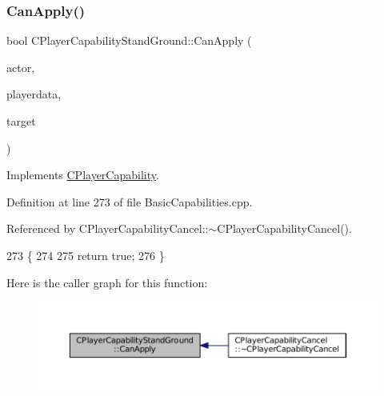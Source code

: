 \subsubsection{\texorpdfstring{Can\+Apply()}{CanApply()}}
{\footnotesize\ttfamily bool C\+Player\+Capability\+Stand\+Ground\+::\+Can\+Apply (\begin{DoxyParamCaption}\item[{std\+::shared\+\_\+ptr$<$ \hyperlink{classCPlayerAsset}{C\+Player\+Asset} $>$}]{actor,  }\item[{std\+::shared\+\_\+ptr$<$ \hyperlink{classCPlayerData}{C\+Player\+Data} $>$}]{playerdata,  }\item[{std\+::shared\+\_\+ptr$<$ \hyperlink{classCPlayerAsset}{C\+Player\+Asset} $>$}]{target }\end{DoxyParamCaption})\hspace{0.3cm}{\ttfamily [virtual]}}



Implements \hyperlink{classCPlayerCapability_ae96263e0950f496492f8baeb877b9554}{C\+Player\+Capability}.



Definition at line 273 of file Basic\+Capabilities.\+cpp.



Referenced by C\+Player\+Capability\+Cancel\+::$\sim$\+C\+Player\+Capability\+Cancel().


\begin{DoxyCode}
273                                                                                                            
                                                        \{
274     
275     \textcolor{keywordflow}{return} \textcolor{keyword}{true};
276 \}
\end{DoxyCode}
Here is the caller graph for this function\+:\nopagebreak
\begin{figure}[H]
\begin{center}
\leavevmode
\includegraphics[width=350pt]{classCPlayerCapabilityStandGround_a468f2618edaebf2088b5917d2688b6f6_icgraph}
\end{center}
\end{figure}
\hypertarget{classCPlayerCapabilityStandGround_a5567bfa47166f4080bd2b86f5c33e29c}{}\label{classCPlayerCapabilityStandGround_a5567bfa47166f4080bd2b86f5c33e29c} 
